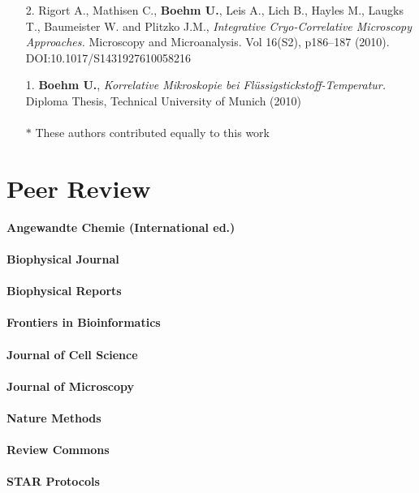 \documentclass[margin,line]{res}
\begin{document}
\begin{resume}
\begin{enumerate}[leftmargin=*]
\item[2.] Rigort A., Mathisen C., {\bf Boehm U.}, Leis A., Lich B., Hayles M., Laugks T., Baumeister W. and Plitzko J.M.,  {\it Integrative Cryo-Correlative Microscopy Approaches.}
Microscopy and Microanalysis. Vol 16(S2), p186–187 (2010). DOI:10.1017/S1431927610058216 

\item[1.]{\bf Boehm U.},  {\it Korrelative Mikroskopie bei Flüssigstickstoff-Temperatur.} Diploma Thesis, Technical University of Munich (2010) \\\\
$*$ These authors contributed equally to this work

\end{enumerate}


\section{\sc Peer Review} 

{\bf   Angewandte Chemie (International ed.)} \\
\vspace*{-4mm}\\
{\bf   Biophysical Journal}\\
\vspace*{-4mm}\\
{\bf   Biophysical Reports}\\
\vspace*{-4mm}\\
{\bf   Frontiers in Bioinformatics }\\
\vspace*{-4mm}\\
{\bf   Journal of Cell Science}\\
\vspace*{-4mm}\\
{\bf  Journal of Microscopy}\\
\vspace*{-4mm}\\
{\bf    Nature Methods}\\
\vspace*{-4mm}\\
{\bf    Review Commons}\\
\vspace*{-4mm}\\
{\bf    STAR Protocols}



\end{resume}
\end{document}
